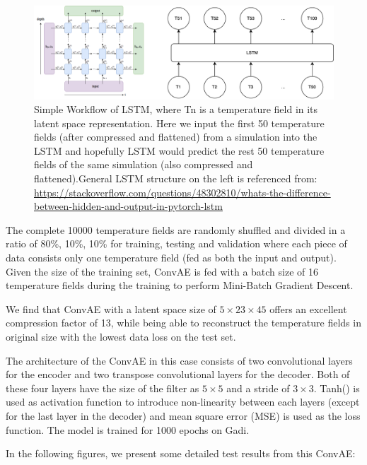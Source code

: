 \begin{figure}[H]
    \centering
    \caption{Simple Workflow of LSTM, where Tn is a temperature field in its latent space representation. Here we input the first 50 temperature fields (after compressed and flattened) from a simulation into the LSTM and hopefully LSTM would predict the rest 50 temperature fields of the same simulation (also compressed and flattened).General LSTM structure on the left is referenced from: \url{https://stackoverflow.com/questions/48302810/whats-the-difference-between-hidden-and-output-in-pytorch-lstm}}
    \includegraphics[scale=0.6]{figures/mantle_convection_images/LSTM_workflow.png}
\end{figure}

The complete 10000 temperature fields are randomly shuffled and divided in a ratio of 80\%, 10\%, 10\% for training, testing and validation where each piece of data consists only one temperature field (fed as both the input and output). Given the size of the training set, ConvAE is fed with a batch size of 16 temperature fields during the training to perform Mini-Batch Gradient Descent.

We find that ConvAE with a latent space size of $5 \times 23 \times 45$ offers an excellent compression factor of 13, while being able to reconstruct the temperature fields in original size with the lowest data loss on the test set.

The architecture of the ConvAE in this case consists of two convolutional layers for the encoder and two transpose convolutional layers for the decoder. Both of these four layers have the size of the filter as $5 \times 5$ and a stride of $3 \times 3$. Tanh() is used as activation function to introduce non-linearity between each layers (except for the last layer in the decoder) and mean square error (MSE) is used as the loss function. The model is trained for 1000 epochs on Gadi.

In the following figures, we present some detailed test results from this ConvAE:

